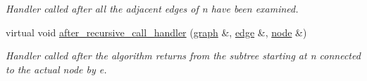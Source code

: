 \begin{DoxyCompactItemize}
\begin{DoxyCompactList}\small\item\em Handler called after all the adjacent edges of {\itshape n} have been examined. \end{DoxyCompactList}\item 
virtual void \mbox{\hyperlink{classdfs_a92fdca8a77b55d08b129aeab4fc66e4c}{after\+\_\+recursive\+\_\+call\+\_\+handler}} (\mbox{\hyperlink{classgraph}{graph}} \&, \mbox{\hyperlink{classedge}{edge}} \&, \mbox{\hyperlink{classnode}{node}} \&)
\begin{DoxyCompactList}\small\item\em Handler called after the algorithm returns from the subtree starting at {\itshape n} connected to the actual node by {\itshape e}. \end{DoxyCompactList}\end{DoxyCompactItemize}
